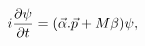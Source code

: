 \begin{equation}
\label{ED}
i{\partial \psi \over \partial t} = (\vec{\alpha }.\vec{p} +
M\beta )\psi,
\end{equation}

